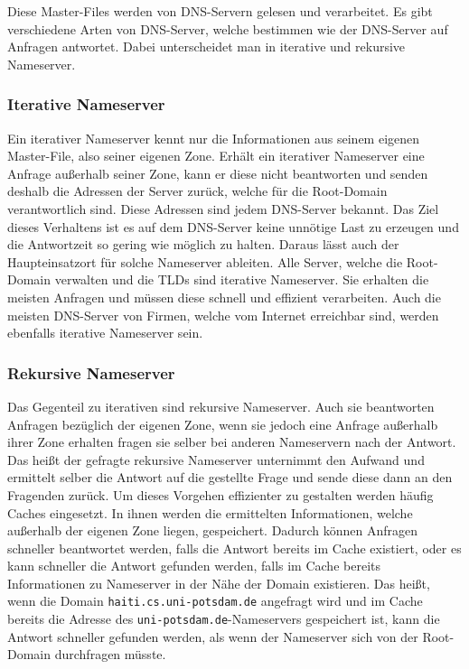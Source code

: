 \documentclass[a4paper, 12pt, BCOR10mm, DIV12, toc=bibliography, toc=listof, german]{scrbook}
\begin{document}
			Diese Master-Files werden von DNS-Servern gelesen und verarbeitet. Es gibt verschiedene Arten
			von DNS-Server, welche bestimmen wie der DNS-Server auf Anfragen antwortet. Dabei
			unterscheidet man in iterative und rekursive Nameserver.

			\subsubsection*{Iterative Nameserver} %

			Ein iterativer Nameserver kennt nur die Informationen aus seinem eigenen Master-File, also
			seiner eigenen Zone. Erhält ein iterativer Nameserver eine Anfrage außerhalb seiner Zone, kann
			er diese nicht beantworten und senden deshalb die Adressen der Server zurück, welche für die
			Root-Domain verantwortlich sind. Diese Adressen sind jedem DNS-Server bekannt. Das Ziel dieses
			Verhaltens ist es auf dem DNS-Server keine unnötige Last zu erzeugen und die Antwortzeit so
			gering wie möglich zu halten. Daraus lässt auch der Haupteinsatzort für solche Nameserver
			ableiten. Alle Server, welche die Root-Domain verwalten und die TLDs sind iterative
			Nameserver. Sie erhalten die meisten Anfragen und müssen diese schnell und effizient
			verarbeiten. Auch die meisten DNS-Server von Firmen, welche vom Internet erreichbar sind,
			werden ebenfalls iterative Nameserver sein.


			\subsubsection*{Rekursive Nameserver} %

			Das Gegenteil zu iterativen sind rekursive Nameserver. Auch sie beantworten Anfragen bezüglich
			der eigenen Zone, wenn sie jedoch eine Anfrage außerhalb ihrer Zone erhalten fragen sie selber
			bei anderen Nameservern nach der Antwort. Das heißt der gefragte rekursive Nameserver
			unternimmt den Aufwand und ermittelt selber die Antwort auf die gestellte Frage und sende
			diese dann an den Fragenden zurück. Um dieses Vorgehen effizienter zu gestalten werden häufig
			Caches eingesetzt. In ihnen werden die ermittelten Informationen, welche außerhalb der eigenen
			Zone liegen, gespeichert. Dadurch können Anfragen schneller beantwortet werden, falls die
			Antwort bereits im Cache existiert, oder es kann schneller die Antwort gefunden werden, falls
			im Cache bereits Informationen zu Nameserver in der Nähe der Domain existieren. Das heißt,
			wenn die Domain \texttt{haiti.cs.uni-potsdam.de} angefragt wird und im Cache bereits die
			Adresse des \texttt{uni-potsdam.de}-Nameservers gespeichert ist, kann die Antwort schneller
			gefunden werden, als wenn der Nameserver sich von der Root-Domain durchfragen müsste.
\end{document}
